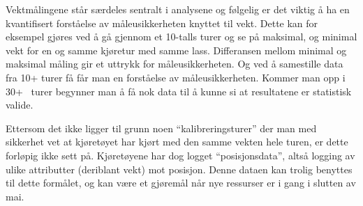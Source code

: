 \begin{formal}
Vektmålingene står særdeles sentralt i analysene og følgelig er det viktig å ha en kvantifisert forståelse av måleusikkerheten knyttet til vekt. Dette kan for eksempel gjøres ved å gå gjennom et 10-talls turer og se på maksimal, og minimal vekt for en og samme kjøretur med samme lass. Differansen mellom minimal og maksimal måling gir et uttrykk for måleusikkerheten. Og ved å samestille data fra 10+ turer få får man en forståelse av måleusikkerheten. Kommer man opp i 30+  turer begynner man å få nok data til å kunne si at resultatene er statistisk valide.
\end{formal}
Ettersom det ikke ligger til grunn noen \enquote{kalibreringsturer} der man med sikkerhet vet at kjøretøyet har
kjørt med den samme vekten hele turen, er dette forløpig ikke sett på.
Kjøretøyene har dog logget \enquote{posisjonsdata}, altså logging av ulike attributter (deriblant vekt) mot posisjon.
Denne dataen kan trolig benyttes til dette formålet, og kan være et gjøremål når nye ressurser er i gang i slutten av mai.
